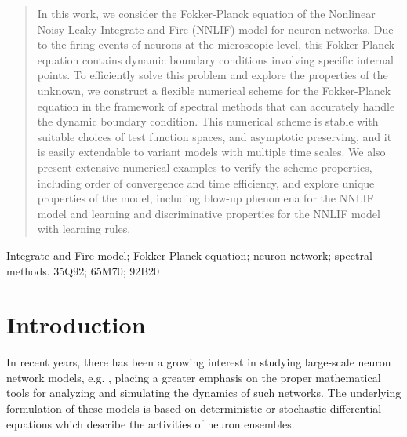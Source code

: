 
\begin{abstract}
    In this work, we consider the Fokker-Planck equation of the Nonlinear Noisy Leaky Integrate-and-Fire (NNLIF) model for neuron networks. Due to the firing events of neurons at the microscopic level, this Fokker-Planck equation contains dynamic boundary conditions involving specific internal points. To efficiently solve this problem and explore the properties of the unknown, we construct a flexible numerical scheme for the Fokker-Planck equation in the framework of spectral methods that can accurately handle the dynamic boundary condition. This numerical scheme is stable with suitable choices of test function spaces, and asymptotic preserving, and it is easily extendable to variant models with multiple time scales. We also present extensive numerical examples to verify the scheme properties, including order of convergence and time efficiency, and explore unique properties of the model, including blow-up phenomena for the NNLIF model and learning and discriminative properties for the NNLIF model with learning rules.
\end{abstract}

\vspace*{4mm}
    Integrate-and-Fire model; Fokker-Planck equation; neuron network; spectral methods.
   35Q92; 65M70; 92B20
  

\section{Introduction}\label{sec:introduction}

In recent years, there has been a growing interest in studying large-scale neuron network models, e.g. \cite{nykamp2000population}\cite{caceres2011analysis}\cite{renart2004mean}\cite{delarue2015global}, placing a greater emphasis on the proper mathematical tools for analyzing and simulating the dynamics of such networks. The underlying formulation of these models is based on deterministic or stochastic differential equations which describe the activities of neuron ensembles.

